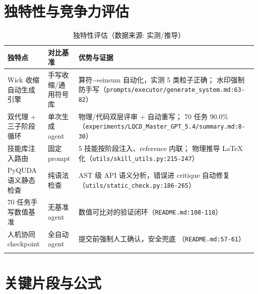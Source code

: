 \documentclass[UTF8]{ctexart}
\begin{document}
\section{独特性与竞争力评估}

\begin{xltabular}{\textwidth}{lXX}
\toprule
\textcolor{algo}{独特点} & 对比基准 & 优势与证据 \\
\midrule
\endhead
Wick 收缩自动生成引擎 & 手写收缩/通用符号库 & 算符→einsum 自动化，实测 5 类粒子正确；
水印强制防手写（\texttt{\nolinkurl{prompts/executor/generate_system.md:63-82}}） \\
双代理 + 三子阶段循环 & 单次生成 agent & 物理/代码双层评审 + 自动重写；
70 任务 90.0\%（\texttt{\nolinkurl{experiments/LQCD_Master_GPT_5.4/summary.md:8-30}}） \\
技能库注入路由 & 固定 prompt & 5 技能按阶段注入、reference 内联；
物理推导 LaTeX 化（\texttt{\nolinkurl{utils/skill_utils.py:215-247}}） \\
PyQUDA 语义静态检查 & 纯语法检查 & AST 级 API 语义分析，错误进 critique 自动修复
（\texttt{\nolinkurl{utils/static_check.py:186-265}}） \\
70 任务手写数值基准 & 无基准 agent & 数值可比对的验证闭环（\texttt{\nolinkurl{README.md:108-118}}） \\
人机协同 checkpoint & 全自动 agent & 提交前强制人工确认，安全兜底
（\texttt{\nolinkurl{README.md:57-61}}） \\
\bottomrule
\caption{独特性评估（数据来源: 实测/推导）}
\end{xltabular}

\section{关键片段与公式}








\end{document}
